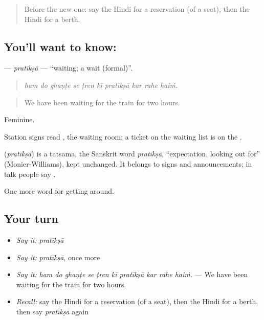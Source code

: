 \label{lesson:HI-C400-pratiksa}



\begin{quote}
Before the new one: say the Hindi for a reservation (of a seat), then the Hindi for a berth.
\end{quote}

\subsection*{You'll want to know: }
\textbf{} — \emph{pratīkṣā} — \textquotedblleft{}waiting; a wait (formal)\textquotedblright{}.

\begin{quote}
         
\end{quote}

\begin{quote}
\emph{ham do ghaṇṭe se ṭren kī pratīkṣā kar rahe haiṁ.}
\end{quote}

\begin{quote}
We have been waiting for the train for two hours.
\end{quote}

Feminine.

Station signs read , the waiting room; a ticket on the waiting list is on the  .

\begin{cousinweb}
\textbf{} (\emph{pratīkṣā}) is a tatsama, the Sanskrit word \emph{pratīkṣā}, \textquotedblleft{}expectation, looking out for\textquotedblright{} (Monier-Williams), kept unchanged. It belongs to signs and announcements; in talk people say .
\end{cousinweb}

\begin{grammarlens}[title={What you've built}]
One more word for getting around.
\end{grammarlens}

\subsection*{Your turn}
\begin{itemize}
\raggedright
  \item \emph{Say it:} \emph{pratīkṣā}
  \item \emph{Say it:} \emph{pratīkṣā}, once more
  \item \emph{Say it:} \emph{ham do ghaṇṭe se ṭren kī pratīkṣā kar rahe haiṁ.} — We have been waiting for the train for two hours.
  \item \emph{Recall:} say the Hindi for a reservation (of a seat), then the Hindi for a berth, then say \emph{pratīkṣā} again
\end{itemize}

